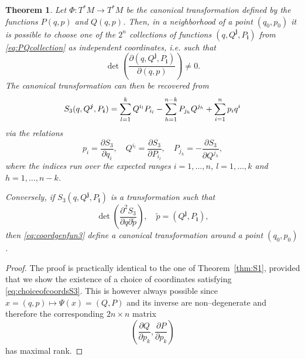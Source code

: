 \documentclass[english,fontsize=11pt,paper=a5,oneside]{scrbook}
\let\d\relax
\DeclareMathOperator{\d}{d}
\newtheorem{theorem}{Theorem}[chapter]
\theoremstyle{definition}
\begin{document}
\begin{theorem}
    Let $\Phi:T^*M \to T^* M$ be the canonical transformation defined by the functions $P(q,p)$ and $Q(q,p)$.
    Then, in a neighborhood of a point $(q_0, p_0)$ it is possible to choose one of the $2^n$ collections of functions $(q, Q^{\bm j}, P_{\bm i})$ from \eqref{eq:PQcollection} as independent coordinates, i.e. such that
    \begin{equation}\label{eq:choiceofcoordsS3}
        \det\left(\frac{\partial (q, Q^{\bm j}, P_{\bm i})}{\partial(q,p)}\right) \neq 0.
    \end{equation}
    The canonical transformation can then be recovered from
    \begin{equation}
        \d S_3(q, Q^{\bm j}, P_{\bm i}) = \sum_{l=1}^k Q^{i_l} \d P_{i_l} -\sum_{h=1}^{n-k} P_{j_h} \d Q^{j_h} + \sum_{i=1}^n p_i \d q^i
    \end{equation}
    via the relations
    \begin{equation}\label{eq:coordgenfun3}
        p_i = \frac{\partial S_3}{\partial q_i}, \quad
        Q^{i_l} = \frac{\partial S_3}{\partial P_{i_l}}, \quad
        P_{j_h} = -\frac{\partial S_3}{\partial Q^{j_h}}, 
    \end{equation}
    where the indices run over the expected ranges $i=1,\ldots,n$, $l=1,\ldots,k$ and $h = 1,\ldots,n-k$.

    Conversely, if $S_3(q, Q^{\bm j}, P_{\bm i})$ is a transformation such that
    \begin{equation}
        \det\left(\frac{\partial^2 S_3}{\partial q \partial \tilde p}\right), \quad \tilde p = (Q^{\bm j}, P_{\bm i}),
    \end{equation}
    then \eqref{eq:coordgenfun3} define a canonical transformation around a point $(q_0, p_0)$.
\end{theorem}

\begin{proof}
    The proof is practically identical to the one of Theorem~\ref{thm:S1}, provided that we show the existence of a choice of coordinates satisfying \eqref{eq:choiceofcoordsS3}.
    This is however always possible since $x=(q,p) \mapsto \Psi(x) = (Q,P)$ and its inverse are non--degenerate and therefore the corresponding $2n\times n$ matrix
    \begin{equation}
        \left(\frac{\partial Q}{\partial p_k}, \frac{\partial P}{\partial p_k}\right)
    \end{equation}
    has maximal rank.
\end{proof}
\end{document}
